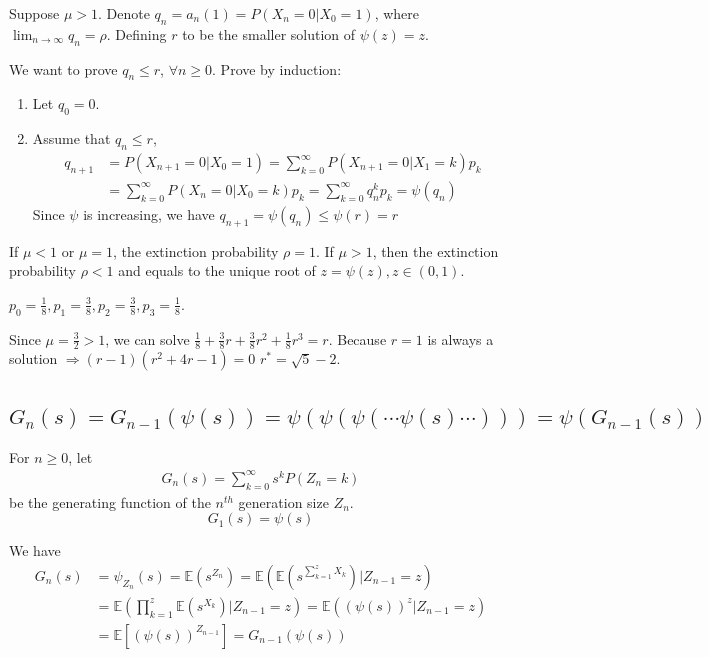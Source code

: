 \documentclass[11pt]{elegantbook}
\begin{document}
Suppose $\mu>1$. Denote $q_n=a_n(1)=P(X_n=0|X_0=1)$, where $\lim_{n \rightarrow \infty}q_n=\rho$. Defining $r$ to be the smaller solution of $\psi(z)=z$.

We want to prove $q_n\leq r$, $\forall n\geq 0$. Prove by induction:
\begin{enumerate}
    \item Let $q_0=0$.
    \item Assume that $q_n\leq r$,
    \begin{equation}
        \begin{aligned}
            q_{n+1}&=P(X_{n+1}=0|X_0=1)=\sum_{k=0}^\infty P(X_{n+1}=0|X_1=k)p_k\\&=\sum_{k=0}^\infty P(X_{n}=0|X_0=k)p_k=\sum_{k=0}^\infty q_n^k p_k=\psi(q_n)
        \end{aligned}
        \nonumber
    \end{equation}
    Since $\psi$ is increasing, we have $q_{n+1}=\psi(q_n)\leq \psi(r)=r$
\end{enumerate}

\begin{theorem}
    If $\mu<1$ or $\mu=1$, the extinction probability $\rho=1$. If $\mu>1$, then the extinction probability $\rho<1$ and equals to the unique root of $z=\psi(z),z\in (0,1)$.
\end{theorem}

\begin{example}
    $p_0=\frac{1}{8},p_1=\frac{3}{8},p_2=\frac{3}{8},p_3=\frac{1}{8}$.
\end{example}
Since $\mu=\frac{3}{2}>1$, we can solve $\frac{1}{8}+\frac{3}{8}r+\frac{3}{8}r^2+\frac{1}{8}r^3=r$. Because $r=1$ is always a solution $\Rightarrow (r-1)(r^2+4r-1)=0$ $r^*=\sqrt{5}-2$.

\subsection{$G_n(s)=G_{n-1}(\psi(s))=\psi(\psi(\psi(\cdots\psi(s)\cdots)))=\psi(G_{n-1}(s))$}
For $n\geq 0$, let
\begin{equation}
    \begin{aligned}
        G_n(s)=\sum_{k=0}^\infty s^k P(Z_n=k)
    \end{aligned}
    \nonumber
\end{equation}
be the generating function of the $n^{th}$ generation size $Z_n$. $$G_1(s)=\psi(s)$$

We have
\begin{equation}
    \begin{aligned}
        G_n(s)&=\psi_{Z_n}(s)=\mathbb{E}(s^{Z_n})= \mathbb{E}\left(\mathbb{E}(s^{\sum_{k=1}^{z}X_k})|Z_{n-1}=z\right)\\
        &=\mathbb{E}\left(\prod_{k=1}^{z}\mathbb{E}(s^{X_k})|Z_{n-1}=z\right)=\mathbb{E}\left((\psi(s))^{z}|Z_{n-1}=z\right)\\
        &=\mathbb{E}\left[(\psi(s))^{Z_{n-1}}\right]=G_{n-1}(\psi(s))
    \end{aligned}
    \nonumber
\end{equation}
\end{document}
